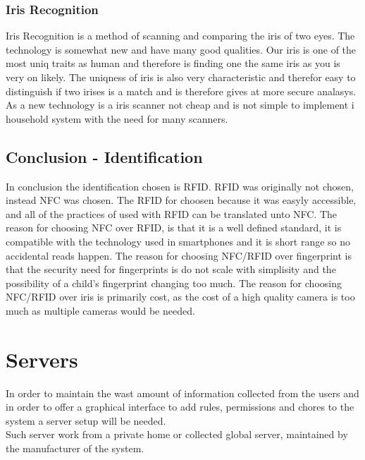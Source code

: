 \subsubsection{Iris Recognition}
Iris Recognition is a method of scanning and comparing the iris of two eyes. The technology is somewhat new and have many good qualities. Our iris is one of the most uniq traits as human and therefore is finding one the same iris as you is very on likely. The uniqness of iris is also very characteristic and therefor easy to distinguish if two irises is a match and is therefore gives at more secure analasys. As a new technology is a iris scanner not cheap and is not simple to implement i household system with the need for many scanners.    

\subsection{Conclusion - Identification}
In conclusion the identification chosen is RFID. RFID was originally not chosen, instead NFC was chosen. The RFID for choosen because it was easyly accessible, and all of the practices of used with RFID can be translated unto NFC. The reason for choosing NFC over RFID, is that it is a well defined standard, it is compatible with the technology used in smartphones and it is short range so no accidental reads happen. The reason for choosing NFC/RFID over fingerprint is that the security need for fingerprints is do not scale with simplisity and the possibility of a child's fingerprint changing too much. The reason for choosing NFC/RFID over iris is primarily cost, as the cost of a high quality camera is too much as multiple cameras would be needed.

\section{Servers}
In order to maintain the wast amount of information collected from the users and in order to offer a graphical interface to add rules, permissions and chores to the system a server setup will be needed.\\
Such server work from a private home or collected global server, maintained by the manufacturer of the system.\\

